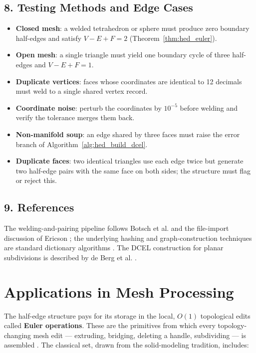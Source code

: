 \subsection{8. Testing Methods and Edge Cases}

\begin{itemize}
  \item \textbf{Closed mesh}: a welded tetrahedron or sphere must produce
    zero boundary half-edges and satisfy
    $V - E + F = 2$ (Theorem~\ref{thm:hed_euler}).
  \item \textbf{Open mesh}: a single triangle must yield one boundary cycle
    of three half-edges and $V - E + F = 1$.
  \item \textbf{Duplicate vertices}: faces whose coordinates are identical
    to 12 decimals must weld to a single shared vertex record.
  \item \textbf{Coordinate noise}: perturb the coordinates by $10^{-5}$
    before welding and verify the tolerance merges them back.
  \item \textbf{Non-manifold soup}: an edge shared by three faces must
    raise the error branch of Algorithm~\ref{alg:hed_build_dcel}.
  \item \textbf{Duplicate faces}: two identical triangles use each edge
    twice but generate two half-edge pairs with the same face on both
    sides; the structure must flag or reject this.
\end{itemize}

\subsection{9. References}

The welding-and-pairing pipeline follows Botsch et al. \cite{botsch2010}
and the file-import discussion of Ericson \cite{ericson2004}; the
underlying hashing and graph-construction techniques are standard
dictionary algorithms \cite{cormen2009}. The DCEL construction for planar
subdivisions is described by de Berg et al. \cite{deberg2008}.


\section{Applications in Mesh Processing}
\label{sec:halfedge_applications}

The half-edge structure pays for its storage in the local, $O(1)$
topological edits called \textbf{Euler operations}.
These are the primitives from which every topology-changing mesh edit ---
extruding, bridging, deleting a handle, subdividing --- is assembled
\cite{botsch2010,deberg2008}. The classical set, drawn from the
solid-modeling tradition, includes:

